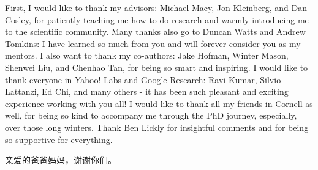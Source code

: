 \documentclass[phd,tocprelim]{cornell}
\begin{document}
\begin{acknowledgements}
First, I would like to thank my advisors: Michael Macy, Jon Kleinberg, and Dan Cosley, for patiently teaching me how to do research and warmly introducing me to the scientific community. Many thanks also go to Duncan Watts and Andrew Tomkins: I have learned so much from you and will forever consider you as my mentors. I also want to thank my co-authors: Jake Hofman, Winter Mason, Shenwei Liu, and Chenhao Tan, for being so smart and inspiring. I would like to thank everyone in Yahoo! Labs and Google Research: Ravi Kumar, Silvio Lattanzi, Ed Chi, and many others - it has been such pleasant and exciting experience working with you all! I would like to thank all my friends in Cornell as well, for being so kind to accompany me through the PhD journey, especially, over those long winters. Thank Ben Lickly for insightful comments and for being so supportive for everything. 

\begin{CJK*}{UTF8}{gkai}
亲爱的爸爸妈妈，谢谢你们。
\end{CJK*}




\end{acknowledgements}

\contentspage
\tablelistpage
\figurelistpage

\normalspacing \setcounter{page}{1} 
\pagestyle{cornell} \addtolength{\parskip}{0.5\baselineskip}

\end{document}
